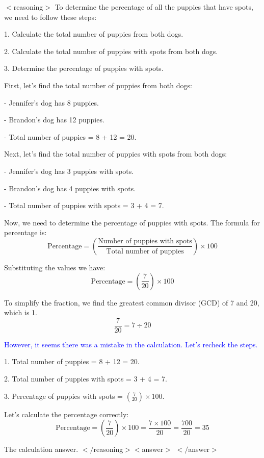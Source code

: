 \begin{tcolorbox}[float,breakable,title=\textbf{Question:} Jennifer's dog has 8 puppies\, 3 of which have spots. Brandon's dog has 12 puppies\, 4 of which have spots. What percentage of all the puppies have spots?]
$<$reasoning$>$
To determine the percentage of all the puppies that have spots, we need to follow these steps:

1. Calculate the total number of puppies from both dogs.

2. Calculate the total number of puppies with spots from both dogs.

3. Determine the percentage of puppies with spots.

First, let's find the total number of puppies from both dogs:

- Jennifer's dog has 8 puppies.

- Brandon's dog has 12 puppies.

- Total number of puppies = 8 + 12 = 20.

Next, let's find the total number of puppies with spots from both dogs:

- Jennifer's dog has 3 puppies with spots.

- Brandon's dog has 4 puppies with spots.

- Total number of puppies with spots = 3 + 4 = 7.

Now, we need to determine the percentage of puppies with spots. The formula for percentage is:
\[ \text{Percentage} = \left( \frac{\text{Number of puppies with spots}}{\text{Total number of puppies}} \right) \times 100 \]

Substituting the values we have:
\[ \text{Percentage} = \left( \frac{7}{20} \right) \times 100 \]

To simplify the fraction, we find the greatest common divisor (GCD) of 7 and 20, which is 1.
\[ \frac{7}{20} = 7 \div 20\]

\textcolor{blue}{However, it seems there was a mistake in the calculation. Let's recheck the steps.}

1. Total number of puppies = 8 + 12 = 20.

2. Total number of puppies with spots = 3 + 4 = 7.

3. Percentage of puppies with spots = \(\left( \frac{7}{20} \right) \times 100\).

Let's calculate the percentage correctly:
\[ \text{Percentage} = \left( \frac{7}{20} \right) \times 100 = \frac{7 \times 100}{20} = \frac{700}{20} = 35 \]

The calculation answer.
$</$reasoning$>
<$answer$>$
\textcolor{green!70!black}{}
$</$answer$>$

\end{tcolorbox}

